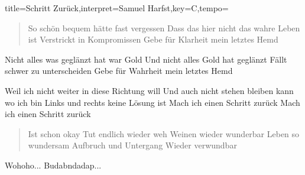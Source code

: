 \documentclass{leadsheet-modern}
\begin{document}
\begin{song}{title={Schritt Zurück},interpret={Samuel Harfst},key={C},tempo={}}

\begin{schedule}
\end{schedule}

\begin{verse}
So schön bequem hätte fast vergessen
Dass das hier nicht das wahre Leben ist
Verstrickt in Kompromissen
Gebe für Klarheit mein letztes Hemd
\end{verse}

\begin{prechorus}
Nicht alles was geglänzt hat war Gold
Und nicht alles Gold hat geglänzt
Fällt schwer zu unterscheiden
Gebe für Wahrheit mein letztes Hemd
\end{prechorus}

\begin{chorus}
Weil ich nicht weiter in diese Richtung will
Und auch nicht stehen bleiben kann wo ich bin
Links und rechts keine Lösung ist
Mach ich einen Schritt zurück
Mach ich einen Schritt zurück
\end{chorus}

\begin{verse}
Ist schon okay
Tut endlich wieder weh
Weinen wieder wunderbar
Leben so wundersam
Aufbruch und Untergang
Wieder verwundbar
\end{verse}

\begin{bridge}
Wohoho...
Budabndadap...
\end{bridge}

\end{song}
\end{document}
